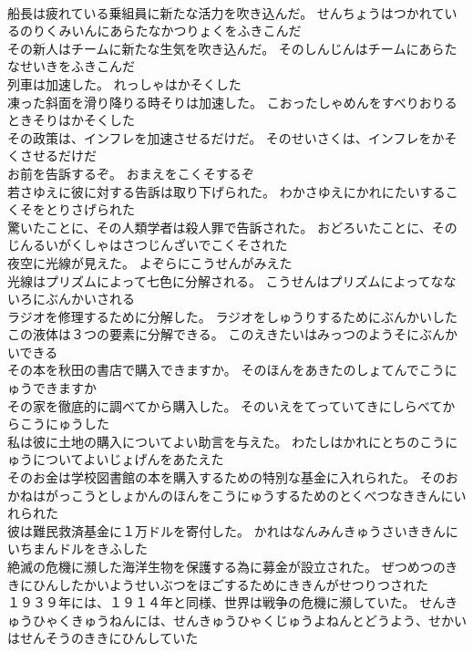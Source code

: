 \documentclass[8pt]{extreport}
\begin{document}
\begin{CJK}{UTF8}{min}
\\	船長は疲れている乗組員に新たな活力を吹き込んだ。	せんちょうはつかれているのりくみいんにあらたなかつりょくをふきこんだ 
\\	その新人はチームに新たな生気を吹き込んだ。	そのしんじんはチームにあらたなせいきをふきこんだ 
\\	列車は加速した。	れっしゃはかそくした 
\\	凍った斜面を滑り降りる時そりは加速した。	こおったしゃめんをすべりおりるときそりはかそくした 
\\	その政策は、インフレを加速させるだけだ。	そのせいさくは、インフレをかそくさせるだけだ 
\\	お前を告訴するぞ。	おまえをこくそするぞ 
\\	若さゆえに彼に対する告訴は取り下げられた。	わかさゆえにかれにたいするこくそをとりさげられた 
\\	驚いたことに、その人類学者は殺人罪で告訴された。	おどろいたことに、そのじんるいがくしゃはさつじんざいでこくそされた 
\\	夜空に光線が見えた。	よぞらにこうせんがみえた 
\\	光線はプリズムによって七色に分解される。	こうせんはプリズムによってなないろにぶんかいされる 
\\	ラジオを修理するために分解した。	ラジオをしゅうりするためにぶんかいした 
\\	この液体は３つの要素に分解できる。	このえきたいはみっつのようそにぶんかいできる 
\\	その本を秋田の書店で購入できますか。	そのほんをあきたのしょてんでこうにゅうできますか 
\\	その家を徹底的に調べてから購入した。	そのいえをてっていてきにしらべてからこうにゅうした 
\\	私は彼に土地の購入についてよい助言を与えた。	わたしはかれにとちのこうにゅうについてよいじょげんをあたえた 
\\	そのお金は学校図書館の本を購入するための特別な基金に入れられた。	そのおかねはがっこうとしょかんのほんをこうにゅうするためのとくべつなききんにいれられた 
\\	彼は難民救済基金に１万ドルを寄付した。	かれはなんみんきゅうさいききんにいちまんドルをきふした 
\\	絶滅の危機に瀕した海洋生物を保護する為に募金が設立された。	ぜつめつのききにひんしたかいようせいぶつをほごするためにききんがせつりつされた 
\\	１９３９年には、１９１４年と同様、世界は戦争の危機に瀕していた。	せんきゅうひゃくきゅうねんには、せんきゅうひゃくじゅうよねんとどうよう、せかいはせんそうのききにひんしていた 

\end{CJK}
\end{document}
